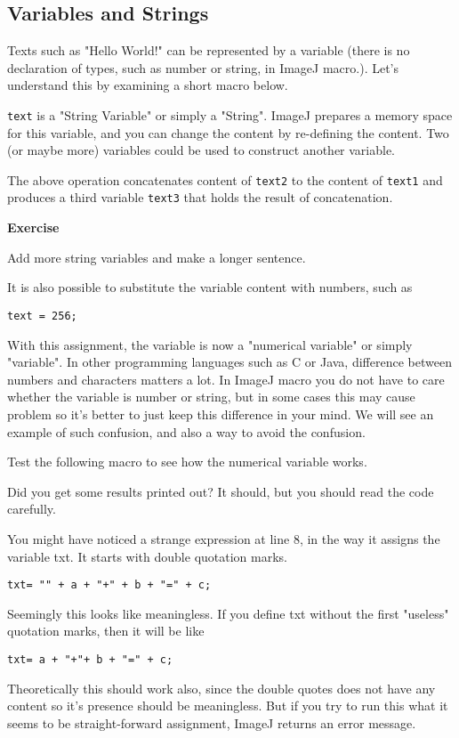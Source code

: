 \documentclass[11pt,a4paper,oneside]{report}
\newenvironment{indentexercise}[1]%
{{\setlength{\leftmargin}{2em}}%
\textbf{Exercise \thesubsection-#1}%
\begin{list}{}%
	\item%
}
{\end{list}}
\newcommand{\ilcom}[1]{\texttt{\small#1}}
\begin{document}
\subsection{Variables and Strings}
Texts such as "Hello World!" can be represented by a variable 
(there is no declaration of types, such as number or string, in ImageJ macro.).
Let's understand this by examining a short macro below.


\ilcom{text} is a "String Variable" or simply a "String". 
ImageJ prepares a memory space for this variable, and you can change the content by re-defining the content. Two (or maybe more) variables could be used to construct another variable. 



The above operation concatenates content of \ilcom{text2} to the content of \ilcom{text1} and produces a third variable \ilcom{text3} that holds the result of concatenation. 

\begin{indentexercise}{1}
\item Add more string variables and make a longer sentence.\\
\end{indentexercise}


It is also possible to substitute the variable content with numbers, such as\\
\begin{lstlisting}[numbers=none]
text = 256;
\end{lstlisting}
With this assignment, the variable is now a "numerical variable" or simply "variable". 
In other programming languages such as C or Java, difference between numbers and characters matters a lot. 
In ImageJ macro you do not have to care whether the variable is number or string, 
but in some cases this may cause problem 
so it's better to just keep this difference in your mind. We will see an example of such confusion, 
and also a way to avoid the confusion. 

Test the following macro to see how the numerical variable works. 

Did you get some results printed out? It should, but you should read the code carefully. 

You might have noticed a strange expression at line 8, in the way it assigns the variable txt. 
It starts with double quotation marks. \\
%
\begin{lstlisting}[numbers=none]
txt= "" + a + "+" + b + "=" + c;
\end{lstlisting}
Seemingly this looks like meaningless. 
If you define txt without the first "useless" quotation marks, then it will be like\\
\begin{lstlisting}[numbers=none]
txt= a + "+"+ b + "=" + c;
\end{lstlisting}
Theoretically this should work also, 
since the double quotes does not have any content so it's presence should be meaningless. But if you try to run this what it seems to be straight-forward assignment, 
ImageJ returns an error message. 
\end{document}
